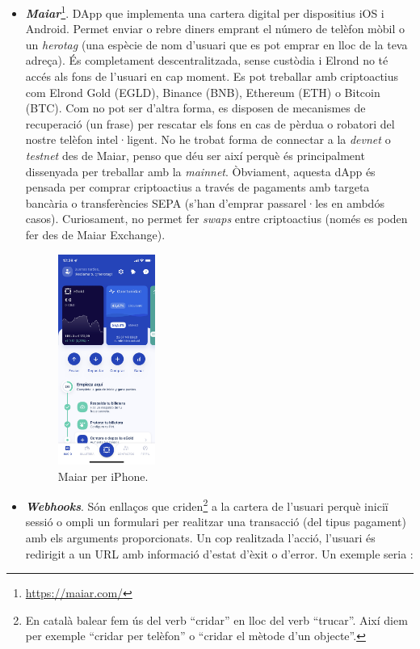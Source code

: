 \documentclass[11pt,a4paper]{article}
\begin{document}
\begin{itemize}
\item \textbf{\textit{Maiar}}\footnote{\url{https://maiar.com/}}. DApp que implementa una cartera digital per dispositius iOS i Android. Permet enviar o rebre diners emprant el número de telèfon mòbil o un \textit{herotag} (una espècie de nom d'usuari que es pot emprar en lloc de la teva adreça). És completament descentralitzada, sense custòdia i Elrond no té accés als fons de l'usuari en cap moment. Es pot treballar amb criptoactius com Elrond Gold (EGLD), Binance (BNB), Ethereum (ETH) o Bitcoin (BTC). Com no pot ser d'altra forma, es disposen de mecanismes de recuperació (un frase) per rescatar els fons en cas de pèrdua o robatori del nostre telèfon intel·ligent. No he trobat forma de connectar a la \textit{devnet} o \textit{testnet} des de Maiar, penso que déu ser així perquè és principalment dissenyada per treballar amb la \textit{mainnet}. Òbviament, aquesta dApp és pensada per comprar criptoactius a través de pagaments amb targeta bancària o transferències SEPA (s'han d'emprar passarel·les en ambdós casos). Curiosament, no permet fer \textit{swaps} entre criptoactius (només es poden fer des de Maiar Exchange).
\begin{figure}[h]
\includegraphics[width=0.3\textwidth]{maiarapp.png}
\centering
\caption{Maiar per iPhone.}\label{fig:maiarapp}
\end{figure} 
\item \textbf{\textit{Webhooks}}. Són enllaços que criden\footnote{En català balear fem ús del verb ``cridar'' en lloc del verb ``trucar''. Així diem per exemple ``cridar per telèfon'' o ``cridar el mètode d'un objecte''.} a la cartera de l'usuari perquè iniciï sessió o ompli un formulari per realitzar una transacció (del tipus pagament) amb els arguments proporcionats. Un cop realitzada l'acció, l'usuari és redirigit a un URL amb informació d'estat d'èxit o d'error. Un exemple seria \cite{elrond2022}:

\end{itemize}
\end{document}
